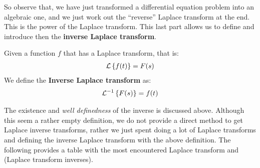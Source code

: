 So observe that, we have just transformed a differential equation problem into an algebraic one, and we just work out the ``reverse'' Laplace transform at the end. This is the power of the Laplace transform.
This last part allows us to define and introduce then the \textbf{inverse Laplace transform}.
\begin{define}
	Given a function $f$ that has a Laplace transform, that is:
	\begin{align*}
	\mathcal{L}\left\lbrace f(t) \right\rbrace = F(s)
	\end{align*}
	We define the \textbf{Inverse Laplace transform} as:
	\begin{align*}
	\mathcal{L}^{-1}\left\lbrace F(s) \right\rbrace = f(t)
	\end{align*}
\end{define}
The existence and \emph{well definedness} of the inverse is discussed above. Although this seem a rather empty definition, we do not provide a direct method to get Laplace inverse transforms, rather we just spent doing a lot of Laplace transforms and defining the inverse Laplace transform with the above definition.
The following provides a table with the most encountered Laplace transform and (Laplace transform inverses).




